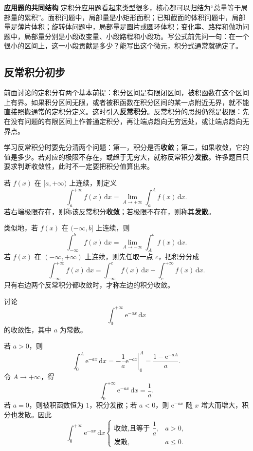 \documentclass[fontset=fandol]{ctexart}
\newenvironment{custom}[1]{\par\noindent\textbf{#1}\quad}{\par\vspace{0.8em}}
\newcommand{\dd}{\mathrm{d}}
\newcommand{\ee}{\mathrm{e}}
\begin{document}
\begin{custom}{应用题的共同结构}
定积分应用题看起来类型很多，核心都可以归结为“总量等于局部量的累积”。面积问题中，局部量是小矩形面积；已知截面的体积问题中，局部量是薄片体积；旋转体问题中，局部量是圆片或圆环体积；变化率、路程和做功问题中，局部量分别是小段改变量、小段路程和小段功。写公式前先问一句：在一个很小的区间上，这一小段贡献是多少？能写出这个微元，积分式通常就确定了。
\end{custom}

\subsection{反常积分初步}

前面讨论的定积分有两个基本前提：积分区间是有限闭区间，被积函数在这个区间上有界。如果积分区间无限，或者被积函数在积分区间的某一点附近无界，就不能直接照搬通常的定积分定义。这时引入\textbf{反常积分}。反常积分的思想仍然是极限：先在没有问题的有限区间上作普通定积分，再让端点趋向无穷远处，或让端点趋向无界点。

学习反常积分时要先分清两个问题：第一，积分是否\textbf{收敛}；第二，如果收敛，它的值是多少。若对应的极限不存在，或趋于无穷大，就称反常积分\textbf{发散}。许多题目只要求判断收敛性，此时不一定要把积分值算出来。

\begin{definition}[无穷区间上的反常积分]
若 $f(x)$ 在 $[a,+\infty)$ 上连续，则定义
\[
\int_a^{+\infty}f(x)\,\dd x
=\lim_{A\to+\infty}\int_a^A f(x)\,\dd x.
\]
若右端极限存在，则称该反常积分\textbf{收敛}；若极限不存在，则称其\textbf{发散}。

类似地，若 $f(x)$ 在 $(-\infty,b]$ 上连续，则
\[
\int_{-\infty}^b f(x)\,\dd x
=\lim_{A\to-\infty}\int_A^b f(x)\,\dd x.
\]
若 $f(x)$ 在 $(-\infty,+\infty)$ 上连续，则先任取一点 $c$，把积分分成
\[
\int_{-\infty}^{+\infty}f(x)\,\dd x
=\int_{-\infty}^{c}f(x)\,\dd x+\int_c^{+\infty}f(x)\,\dd x.
\]
只有右边两个反常积分都收敛时，才称左边的积分收敛。
\end{definition}

\begin{example}[指数函数在无穷区间上的积分]
讨论
\[
\int_0^{+\infty}\ee^{-ax}\,\dd x
\]
的收敛性，其中 $a$ 为常数。

若 $a>0$，则
\[
\int_0^A \ee^{-ax}\,\dd x
=\left.-\frac1a \ee^{-ax}\right|_0^A
=\frac{1-\ee^{-aA}}a.
\]
令 $A\to+\infty$，得
\[
\int_0^{+\infty}\ee^{-ax}\,\dd x=\frac1a.
\]
若 $a=0$，则被积函数恒为 $1$，积分发散；若 $a<0$，则 $\ee^{-ax}$ 随 $x$ 增大而增大，积分也发散。因此
\[
\int_0^{+\infty}\ee^{-ax}\,\dd x
\begin{cases}
\text{收敛,且等于 }\dfrac1a,&a>0,\\
\text{发散},&a\leq0.
\end{cases}
\]
\end{example}
\end{document}
